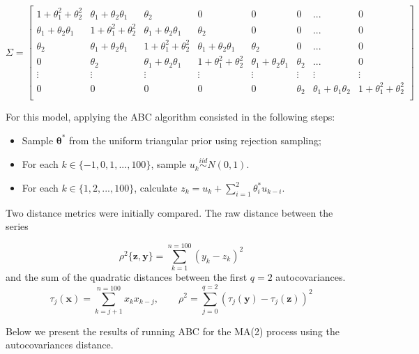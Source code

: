 \documentclass[runningheads]{llncs}
\begin{document}
$$
\Sigma =
\left[ 
\begin{smallmatrix}
 1+\theta_1^2 + \theta_2^2    & \theta_1 + \theta_2 \theta_1 & \theta_2                     & 0                            & 0        & 0 & ... & 0 \\
 \theta_1 + \theta_2 \theta_1 & 1+\theta_1^2 + \theta_2^2    & \theta_1 + \theta_2 \theta_1 & \theta_2                     & 0        & 0 & ... & 0 \\
 \theta_2                     & \theta_1 + \theta_2 \theta_1 & 1+\theta_1^2 + \theta_2^2    & \theta_1 + \theta_2 \theta_1 & \theta_2 & 0 & ... & 0 \\
 0               & \theta_2   & \theta_1 + \theta_2 \theta_1 & 1+\theta_1^2 + \theta_2^2    & \theta_1 + \theta_2 \theta_1 & \theta_2 &... & 0 \\
 \vdots & \vdots & \vdots & \vdots & \vdots & \vdots & \vdots & \vdots \\
 0 & 0 & 0 & 0 & 0 & \theta_2 & \theta_1 + \theta_1\theta_2 & 1+\theta_1^2 + \theta_2^2 \\
\end{smallmatrix}
\right]
$$

For this model, applying the ABC algorithm consisted in the
following steps:
\begin{itemize}
  \item Sample $\bm \theta ^ *$ from the uniform triangular prior
  using rejection sampling;
  \item For each $k \in \{-1,0, 1, ..., 100 \}$, sample
  $u_k \overset{iid}{\sim} N(0,1)$.
  \item For each $k \in \{ 1, 2, ..., 100\}$, calculate 
  $z_k = u_k + \sum^2_{i=1}\theta_i^* u_{k-i}$.
\end{itemize}

Two distance metrics were initially compared.
The raw distance between the series

\begin{equation}
\rho^2\{ \bm z, \bm y\} = \sum^{n=100}_{k=1}(y_k - z_k)^2
\end{equation}
and the sum of the quadratic distances between the first $q = 2$
autocovariances.
\begin{equation}
\tau_j(\bm x) = \sum^{n=100}_{k = j+1} x_k x_{k-j}, \quad \quad
\rho^2 = \sum^{q=2}_{j=0}(\tau_j(\bm y) - \tau_j(\bm z))^2
\end{equation}

Below we present the results of running ABC for the MA(2) process
using the autocovariances distance.
\end{document}
